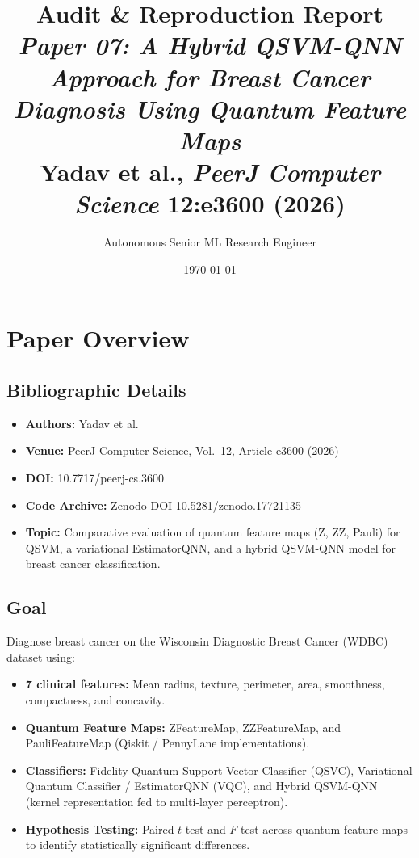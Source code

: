 \documentclass[12pt,a4paper]{article}
\title{\textbf{Audit \& Reproduction Report}\\[0.4em]
\large\textit{Paper 07: A Hybrid QSVM-QNN Approach for Breast Cancer Diagnosis Using Quantum Feature Maps}\\[0.3em]
Yadav et al., \textit{PeerJ Computer Science} 12:e3600 (2026)}
\author{Autonomous Senior ML Research Engineer}
\date{\today}
\begin{document}
\maketitle
\tableofcontents
\newpage

\section{Paper Overview}
\subsection{Bibliographic Details}
\begin{itemize}[leftmargin=*]
  \item \textbf{Authors:} Yadav et al.
  \item \textbf{Venue:} PeerJ Computer Science, Vol.~12, Article e3600 (2026)
  \item \textbf{DOI:} 10.7717/peerj-cs.3600
  \item \textbf{Code Archive:} Zenodo DOI 10.5281/zenodo.17721135
  \item \textbf{Topic:} Comparative evaluation of quantum feature maps (Z, ZZ, Pauli) for QSVM, a variational EstimatorQNN, and a hybrid QSVM-QNN model for breast cancer classification.
\end{itemize}

\subsection{Goal}
Diagnose breast cancer on the Wisconsin Diagnostic Breast Cancer (WDBC) dataset using:
\begin{itemize}[leftmargin=*]
  \item \textbf{7 clinical features:} Mean radius, texture, perimeter, area, smoothness, compactness, and concavity.
  \item \textbf{Quantum Feature Maps:} ZFeatureMap, ZZFeatureMap, and PauliFeatureMap (Qiskit / PennyLane implementations).
  \item \textbf{Classifiers:} Fidelity Quantum Support Vector Classifier (QSVC), Variational Quantum Classifier / EstimatorQNN (VQC), and Hybrid QSVM-QNN (kernel representation fed to multi-layer perceptron).
  \item \textbf{Hypothesis Testing:} Paired $t$-test and $F$-test across quantum feature maps to identify statistically significant differences.
\end{itemize}
\end{document}
